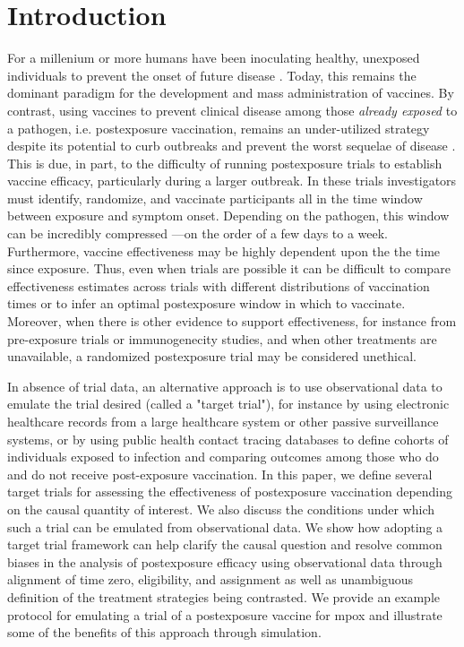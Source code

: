 \documentclass[11pt]{article}
\begin{document}
\section{Introduction} \label{sec:introduction}
For a millenium or more humans have been inoculating healthy, unexposed individuals to prevent the onset of future disease \cite{plotkin2012vaccines}. Today, this remains the dominant paradigm for the development and mass administration of vaccines. By contrast, using vaccines to prevent clinical disease among those \textit{already exposed} to a pathogen, i.e. postexposure vaccination, remains an under-utilized strategy despite its potential to curb outbreaks and prevent the worst sequelae of disease \cite{gallagher_postexposure_2019}. This is due, in part, to the difficulty of running postexposure trials to establish vaccine efficacy, particularly during a larger outbreak. In these trials investigators must identify, randomize, and vaccinate participants all in the time window between exposure and symptom onset. Depending on the pathogen, this window can be incredibly compressed ---on the order of a few days to a week. Furthermore, vaccine effectiveness may be highly dependent upon the the time since exposure. Thus, even when trials are possible it can be difficult to compare effectiveness estimates across trials with different distributions of vaccination times or to infer an optimal postexposure window in which to vaccinate. Moreover, when there is other evidence to support effectiveness, for instance from pre-exposure trials or immunogenecity studies, and when other treatments are unavailable, a randomized postexposure trial may be considered unethical.

In absence of trial data, an alternative approach is to use observational data to emulate the trial desired \cite{hernan_observational_2008,hernan_using_2016} (called a "target trial"), for instance by using electronic healthcare records from a large healthcare system or other passive surveillance systems, or by using public health contact tracing databases to define cohorts of individuals exposed to infection and comparing outcomes among those who do and do not receive post-exposure vaccination. In this paper, we define several target trials for assessing the effectiveness of postexposure vaccination depending on the causal quantity of interest. We also discuss the conditions under which such a trial can be emulated from observational data. We show how adopting a target trial framework can help clarify the causal question and resolve common biases in the analysis of postexposure efficacy using observational data through alignment of time zero, eligibility, and assignment as well as unambiguous definition of the treatment strategies being contrasted. We provide an example protocol for emulating a trial of a postexposure vaccine for mpox and illustrate some of the benefits of this approach through simulation.
\end{document}
